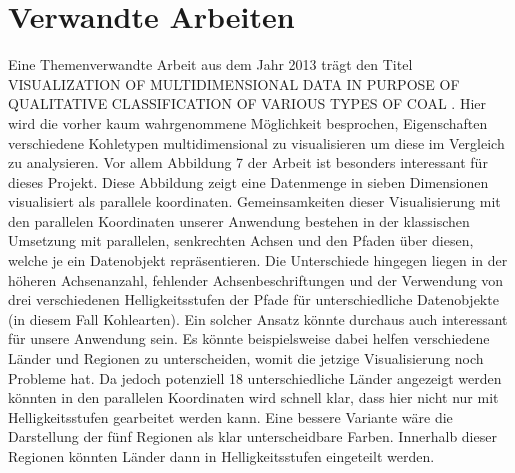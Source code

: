 \documentclass[usegeometry=true]{scrartcl}
\begin{document}
\section{Verwandte Arbeiten}
Eine Themenverwandte Arbeit aus dem Jahr 2013 trägt den Titel \glqq VISUALIZATION OF MULTIDIMENSIONAL DATA IN PURPOSE OF QUALITATIVE CLASSIFICATION OF VARIOUS TYPES OF COAL\grqq{} \cite{coal}. Hier wird die vorher kaum wahrgenommene Möglichkeit besprochen, Eigenschaften verschiedene Kohletypen multidimensional zu visualisieren um diese im Vergleich zu analysieren. Vor allem Abbildung 7 der Arbeit ist besonders interessant für dieses Projekt. Diese Abbildung zeigt eine Datenmenge in sieben Dimensionen visualisiert als parallele koordinaten. Gemeinsamkeiten dieser Visualisierung mit den parallelen Koordinaten unserer Anwendung bestehen in der klassischen Umsetzung mit parallelen, senkrechten Achsen und den Pfaden über diesen, welche je ein Datenobjekt repräsentieren. Die Unterschiede hingegen liegen in der höheren Achsenanzahl, fehlender Achsenbeschriftungen und der Verwendung von drei verschiedenen Helligkeitsstufen der Pfade für unterschiedliche Datenobjekte (in diesem Fall Kohlearten). Ein solcher Ansatz könnte durchaus auch interessant für unsere Anwendung sein. Es könnte beispielsweise dabei helfen verschiedene Länder und Regionen zu unterscheiden, womit die jetzige Visualisierung noch Probleme hat. Da jedoch potenziell 18 unterschiedliche Länder angezeigt werden könnten in den parallelen Koordinaten wird schnell klar, dass hier nicht nur mit Helligkeitsstufen gearbeitet werden kann. Eine bessere Variante wäre die Darstellung der fünf Regionen als klar unterscheidbare Farben. Innerhalb dieser Regionen könnten Länder dann in Helligkeitsstufen eingeteilt werden.\\
\end{document}
